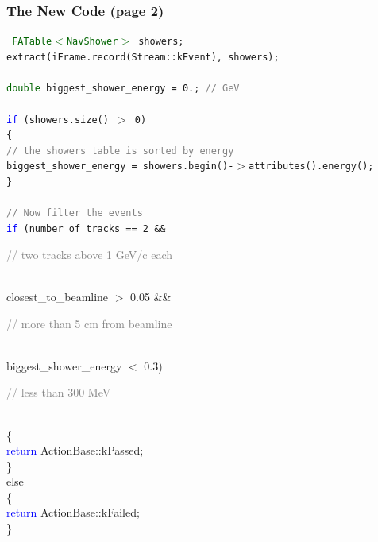 \documentclass[12pt,compress]{beamer}
\begin{document}
\begin{frame}
\frametitle{The New Code (page 2)}
\tt \scriptsize
\textcolor{darkgreen}{FATable$<$NavShower$>$} showers; \\
extract(iFrame.record(Stream::kEvent), showers); \\
\mbox{ } \\
\textcolor{darkgreen}{double} biggest\_shower\_energy = 0.;  \textcolor{gray}{// GeV} \\
\mbox{ } \\
\textcolor{blue}{if} (showers.size() $>$ 0) \\
\{ \\
\mbox{\hspace{0.5 cm}}\textcolor{gray}{// the showers table is sorted by energy} \\
\mbox{\hspace{0.5 cm}}biggest\_shower\_energy = showers.begin()-$>$attributes().energy(); \\
\} \\
\mbox{ } \\
\textcolor{gray}{// Now filter the events} \\
\textcolor{blue}{if} (number\_of\_tracks == 2  \&\& \hfill \begin{minipage}{5 cm}\textcolor{gray}{// two tracks above 1 GeV/c each}\end{minipage} \\
\mbox{\hspace{0.5 cm}} closest\_to\_beamline $>$ 0.05  \&\& \hfill \begin{minipage}{5 cm}\textcolor{gray}{// more than 5 cm from beamline}\end{minipage} \\
\mbox{\hspace{0.5 cm}} biggest\_shower\_energy $<$ 0.3) \hfill \begin{minipage}{5 cm}\textcolor{gray}{// less than 300 MeV}\end{minipage} \\
\{ \\
\mbox{\hspace{0.5 cm}}\textcolor{blue}{return} ActionBase::kPassed; \\
\} \\
else \\
\{ \\
\mbox{\hspace{0.5 cm}}\textcolor{blue}{return} ActionBase::kFailed; \\
\}
\end{frame}
\end{document}
